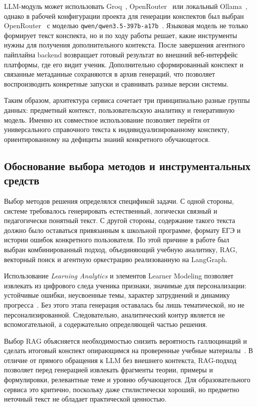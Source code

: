 \documentclass[a4paper,12pt]{extarticle}
\begin{document}
LLM-модуль может использовать Groq~\cite{groq2026}, OpenRouter~\cite{openrouter2026} или 
локальный Ollama~\cite{ollama2026}, однако в
рабочей конфигурации проекта для генерации конспектов был выбран OpenRouter~\cite{openrouter2026} с
моделью \texttt{qwen/qwen3.5-397b-a17b}~\cite{qwen35-397b-a17b}. Языковая модель не только формирует
текст конспекта, но и по ходу работы решает, какие инструменты нужны для
получения дополнительного контекста. После завершения агентного пайплайна
backend возвращает готовый результат во внешний веб-интерфейс платформы, где его
видит ученик. Дополнительно сформированный конспект и связанные метаданные
сохраняются в архив генераций, что позволяет воспроизводить конкретные запуски и
сравнивать разные версии системы.

Таким образом, архитектура сервиса сочетает три принципиально разные группы данных: 
предметный контекст, пользовательскую аналитику и генеративную модель. 
Именно их совместное использование позволяет перейти от универсального справочного текста к 
индивидуализированному конспекту, ориентированному на дефициты знаний конкретного обучающегося.

\subsection{Обоснование выбора методов и инструментальных средств}

Выбор методов решения определялся спецификой задачи. С одной стороны, системе требовалось 
генерировать естественный, логически связный и педагогически понятный текст. 
С другой стороны, содержание такого текста должно было оставаться привязанным к школьной 
программе, формату ЕГЭ и истории ошибок конкретного пользователя. По этой причине в работе 
был выбран комбинированный подход, объединяющий учебную аналитику, 
RAG, векторный поиск и агентную оркестрацию реализованную на LangGraph.

Использование \textit{Learning Analytics} и элементов Learner Modeling позволяет извлекать 
из цифрового следа ученика признаки, значимые для персонализации: устойчивые ошибки, 
неусвоенные темы, характер затруднений и динамику 
прогресса~\cite{khor2024la,abdelrahman2023ktsurvey}. 
Без этого этапа генерация оставалась бы лишь тематической, но не персонализированной. 
Следовательно, аналитический контур является не вспомогательной, а содержательно 
определяющей частью решения.

Выбор RAG объясняется необходимостью снизить вероятность галлюцинаций и сделать 
итоговый конспект опирающимся на проверенные учебные 
материалы~\cite{lewis2020rag,gao2024ragsurvey,ding2025ragedu}. 
В отличие от прямого обращения к LLM без внешнего контекста, 
RAG-подход позволяет перед генерацией извлекать фрагменты теории, 
примеры и формулировки, релевантные теме и уровню обучающегося. 
Для образовательного сервиса это критично, поскольку даже стилистически хороший, 
но предметно неточный текст не обладает практической ценностью.
\end{document}
